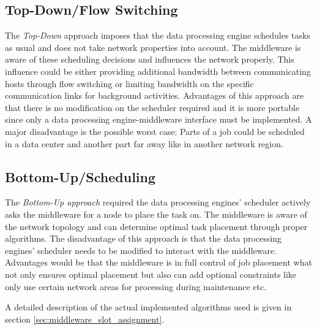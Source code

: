 \subsection{Top-Down/Flow Switching}
The \textit{Top-Down} approach imposes that the data processing engine schedules tasks as usual and
does not take network properties into account. The middleware is aware of these scheduling decisions
and influences the network properly. This influence could be either providing additional bandwidth
between communicating hosts through flow switching or limiting bandwidth on the specific
communication links for background activities. Advantages of this approach are that there is no
modification on the scheduler required and it is more portable since only a data processing
engine-middleware interface must be implemented. A major disadvantage is the possible worst case:
Parts of a job could be scheduled in a data center and another part far away like in another network
region.

\subsection{Bottom-Up/Scheduling}
The \textit{Bottom-Up approach} required the data processing engines' scheduler actively asks the
middleware for a node to place the task on. The middleware is aware of the network topology and can
determine optimal task placement through proper algorithms. The disadvantage of this approach is
that the data processing engines’ scheduler needs to be modified to interact with the middleware.
Advantages would be that the middleware is in full control of job placement what not only ensures
optimal placement but also can add optional constraints like only use certain network areas for
processing during maintenance etc.

A detailed description of the actual implemented algorithms used is given in section
\ref{sec:middleware_slot_assignment}.
